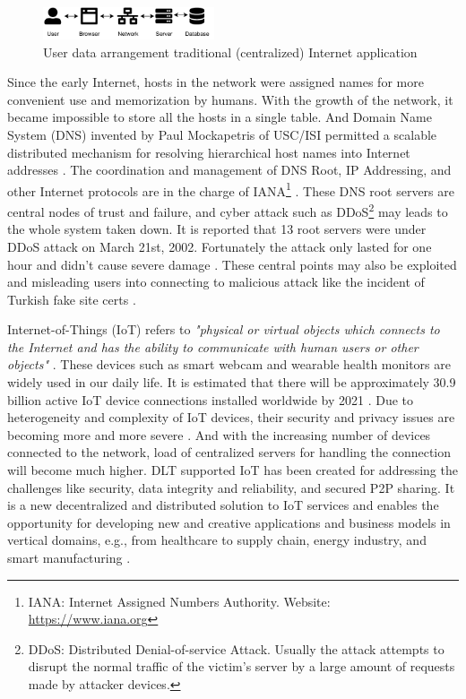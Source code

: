 \begin{figure}[h]
    \includegraphics[width=0.45\textwidth,trim={-1cm 0 0.25cm 0},clip]{figs/traditional_internet.pdf}
    \caption{User data arrangement traditional (centralized) Internet application}
    \label{fig:traditional_internet}
\end{figure}

Since the early Internet, hosts in the network were assigned names for more convenient use and memorization by humans. With the growth of the network, it became impossible to store all the hosts in a single table.
And Domain Name System (DNS) invented by Paul Mockapetris of USC/ISI permitted a scalable distributed mechanism for resolving hierarchical host names into Internet addresses \cite{leiner2009brief}.
The coordination and management of DNS Root, IP Addressing, and other Internet protocols are in the charge of IANA\footnote{IANA: Internet Assigned Numbers Authority. Website: \url{https://www.iana.org}} \cite{Postel1994DomainNS}.
These DNS root servers are central nodes of trust and failure, and cyber attack such as DDoS\footnote{DDoS: Distributed Denial-of-service Attack.
    Usually the attack attempts to disrupt the normal traffic of the victim's server by a large amount of requests made by attacker devices.} may leads to the whole system taken down.
It is reported that 13 root servers were under DDoS attack on March 21st, 2002. Fortunately the attack only lasted for one hour and didn't cause severe damage \cite{mcguire2002attack}.
These central points may also be exploited and misleading users into connecting to malicious attack like the incident of Turkish fake site certs \cite{rosenblatt_2013}.


Internet-of-Things (IoT) refers to \textit{"physical or virtual objects which connects to the Internet and has the ability to communicate with human users or other objects"} \cite{6978614}.
These devices such as smart webcam and wearable health monitors are widely used in our daily life.
It is estimated that there will be approximately 30.9 billion active IoT device connections installed worldwide by 2021 \cite{statista_2021}.
Due to heterogeneity and complexity of IoT devices, their security and privacy issues are becoming more and more severe \cite{6978614}.
And with the increasing number of devices connected to the network, load of centralized servers for handling the connection will become much higher.
DLT supported IoT has been created for addressing the challenges like security, data integrity and reliability, and secured P2P sharing. 
It is a new decentralized and distributed solution to IoT services and enables the opportunity for developing new and creative applications and business models in vertical domains, e.g., from healthcare to supply chain, energy industry, and smart manufacturing \cite{Farahani2020TheCO}.


